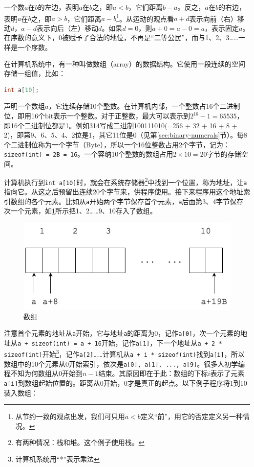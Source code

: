 \documentclass[b5paper]{ctexart}
\begin{document}
\label{sec:zero-as-ordinal} 
一个数$a$在$b$的左边，表明$a$在$b$之，即$a < b$，它们距离$b - a$。反之，$a$在$b$的右边，表明$a$在$b$之，即$a > b$，它们距离$a - b$\footnote{从节约一致的观点出发，我们可只用$a<b$定义“前”，用它的否定定义另一种情况。}。从运动的观点看$a + d$表示向前（右）移动$d$，$a - d$表示向后（左）移动$d$。如果$d = 0$，则$a + 0 = a - 0 = a$，表示固定$a$。在序数的意义下，0被赋予了合法的地位，不再是“二等公民”，而与1、2、3……一样是一个序数。

在计算机系统中，有一种叫做数组（array）的数据结构。它使用一段连续的空间存储一组值，比如：

\begin{lstlisting}[language=C, frame=single]
int a[10];
\end{lstlisting}

声明一个数组$a$，它连续存储10个整数。在计算机内部，一个整数占16个二进制位，即用16个bit表示一个整数。对于正整数，最大可以表示到$2^{16}-1 = 65535$，即16个二进制位都是1。例如314写成二进制100111010(=256 + 32 + 16 + 8 + 2)，即第9、6、5、4、2位是1，其它11位是0（见第\ref{sec:binary-numerals}节）。每8个二进制位称为一个字节（Byte），所以一个16位整数占用2个字节，记为：\lstinline|sizeof(int) = 2B = 16|。一个容纳10个整数的数组占用$2 \times 10 = 20$字节的存储空间。

计算机执行到\lstinline|int a[10]|时，就会在系统存储器\footnote{有两种情况：栈和堆。这个例子使用栈。}中找到一个位置，称为地址，让\lstinline|a|指向它。从这之后预留出连续20个字节来，供程序使用。接下来程序用这个地址索引数组的各个元素。比如从\lstinline|a|开始两个字节保存首个元素，\lstinline|a|后面第3、4字节保存次一个元素，如\cref{fig:array}所示把1、2……9、10存入了数组。

\begin{figure}[htbp]
 \centering
 \includegraphics[scale=0.35]{img/array}
 \caption{数组}
 \label{fig:array}
\end{figure}

注意首个元素的地址从\lstinline|a|开始，它与地址\lstinline|a|的距离为0，记作\lstinline|a[0]|，次一个元素的地址从\lstinline|a + sizeof(int) = a + 16|开始，记作\lstinline|a[1]|，下一个地址从\lstinline|a + 2 * sizeof(int)|开始\footnote{计算机系统用“*”表示乘法}，记作\lstinline|a[2]|……计算机从\lstinline|a + i * sizeof(int)|找到\lstinline|a[i]|，所以数组中的10个元素从0开始索引，依次是\lstinline|a[0], a[1], ..., a[9]|。很多人初学编程不知为何数组从0开始到$n-1$结束。其原因即在于此：数组的下标$i$表示了元素\lstinline|a[i]|到数组起始位置的。距离从0开始，0才是真正的起点。以下例子程序将1到10装入数组：
\end{document}
